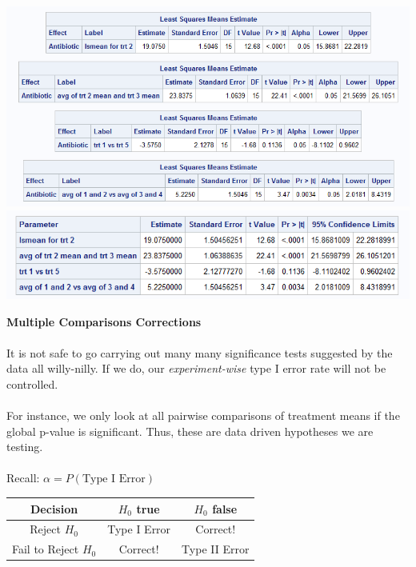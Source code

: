 \newpage

\begin{center}
\includegraphics[scale=0.8]{BindFracMixedEstimate}\\
\includegraphics[scale=0.8]{BindFracGLMEstimate}
\end{center}

\newpage

\textbf{Multiple Comparisons Corrections}\\~\\
It is not safe to go carrying out many many significance tests suggested by the data all willy-nilly.  If we do, our \textit{experiment-wise} type I error rate will not be controlled.\\~\\

For instance, we only look at all pairwise comparisons of treatment means if the global p-value is significant.  Thus, these are data driven hypotheses we are testing.  \\~\\

Recall: $\alpha=P(\mbox{Type I Error})$\\
\begin{center}
\begin{tabular}{c|cc}
Decision & $H_0$ true & $H_0$ false\\\hline
Reject $H_0$ & Type I Error & Correct! \\
Fail to Reject $H_0$ & Correct! & Type II Error
\end{tabular}
\end{center}

